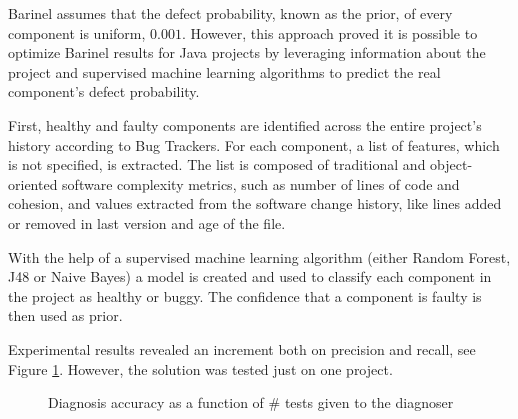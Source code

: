 Barinel assumes that the defect probability, known as the prior, of every component is uniform, $0.001$. However, this approach proved it is possible to optimize Barinel results for Java projects by leveraging information about the project and supervised machine learning algorithms to predict the real component's defect probability.

First, healthy and faulty components are identified across the entire project's history according to Bug Trackers. For each component, a list of features, which is not specified, is extracted. The list is composed of traditional and object-oriented software complexity metrics, such as number of lines of code and cohesion, and values extracted from the software change history, like lines added or removed in last version and age of the file.

With the help of a supervised machine learning algorithm (either Random Forest, J48 or Naive Bayes) a model is created and used to classify each component in the project as healthy or buggy. The confidence that a component is faulty is then used as prior.

Experimental results revealed an increment both on precision and recall, see Figure \ref{fig:elmishali}. However, the solution was tested just on one project.
%
\begin{figure}%
    \centering
    \qquad
    \caption{Diagnosis accuracy as a function of \# tests given to the diagnoser}%
    \label{fig:elmishali}%
\end{figure}
